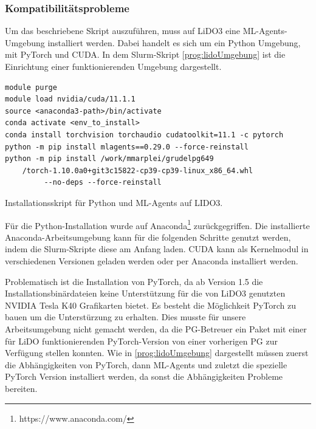 \subsubsection{Kompatibilitätsprobleme}
Um das beschriebene Skript auszuführen, muss auf LiDO3 eine ML-Agents-Umgebung installiert werden. Dabei handelt es sich um ein Python Umgebung, mit PyTorch und CUDA. In dem Slurm-Skript \ref{prog:lidoUmgebung} ist die Einrichtung einer funktionierenden Umgebung dargestellt. 

\begin{listing}
	\begin{verbatim}
module purge
module load nvidia/cuda/11.1.1
source <anaconda3-path>/bin/activate
conda activate <env_to_install>
conda install torchvision torchaudio cudatoolkit=11.1 -c pytorch
python -m pip install mlagents==0.29.0 --force-reinstall
python -m pip install /work/mmarplei/grudelpg649
    /torch-1.10.0a0+git3c15822-cp39-cp39-linux_x86_64.whl
         --no-deps --force-reinstall 
	\end{verbatim}
	\caption{Installationsskript für Python und ML-Agents auf LIDO3.}
	\label{prog:lidoUmgebung}
\end{listing}
\begin{sloppypar}
Für die Python-Installation wurde auf Anaconda\footnote{https://www.anaconda.com/} zurückgegriffen. Die installierte Anaconda-Arbeitsumgebung kann für die folgenden Schritte genutzt werden, indem die Slurm-Skripte diese am Anfang laden. CUDA kann als Kernelmodul in verschiedenen Versionen geladen werden oder per Anaconda installiert werden.
\end{sloppypar}
Problematisch ist die Installation von PyTorch, da ab Version 1.5 die Installationsbinärdateien keine Unterstützung für die von LiDO3 genutzten NVIDIA Tesla K40 Grafikarten bietet. Es besteht die Möglichkeit PyTorch zu bauen um die Unterstürzung zu erhalten. Dies musste für unsere Arbeitsumgebung nicht gemacht werden, da die PG-Betreuer ein Paket mit einer für LiDO funktionierenden PyTorch-Version von einer vorherigen PG zur Verfügung stellen konnten. Wie in \ref{prog:lidoUmgebung} dargestellt müssen zuerst die Abhängigkeiten von PyTorch, dann ML-Agents und zuletzt die spezielle PyTorch Version installiert werden, da sonst die Abhängigkeiten Probleme bereiten.


